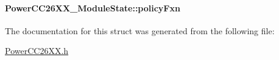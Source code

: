 \paragraph[{policy\+Fxn}]{ Power\+C\+C26\+X\+X\+\_\+\+Module\+State\+::policy\+Fxn}\label{struct_power_c_c26_x_x___module_state_a11876366e8d0d07879231d033ab31e57}


The documentation for this struct was generated from the following file\+:\begin{DoxyCompactItemize}
\item 
\hyperlink{_power_c_c26_x_x_8h}{Power\+C\+C26\+X\+X.\+h}\end{DoxyCompactItemize}
